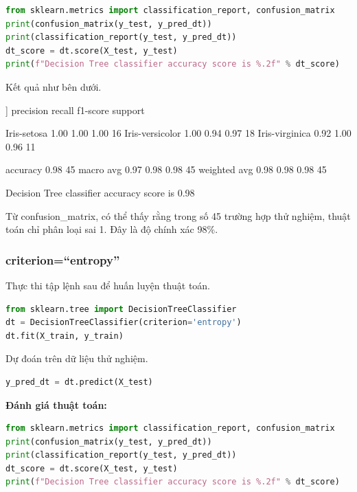 \begin{lstlisting}[language=Python]
from sklearn.metrics import classification_report, confusion_matrix
print(confusion_matrix(y_test, y_pred_dt))
print(classification_report(y_test, y_pred_dt))
dt_score = dt.score(X_test, y_test)
print(f"Decision Tree classifier accuracy score is %.2f" % dt_score)
\end{lstlisting}

Kết quả như bên dưới.

\begin{terminaloutput}
[[16  0  0]
[ 0 17  1]
[ 0  0 11]]
                 precision    recall  f1-score   support

    Iris-setosa       1.00      1.00      1.00        16
Iris-versicolor       1.00      0.94      0.97        18
 Iris-virginica       0.92      1.00      0.96        11

       accuracy                           0.98        45
      macro avg       0.97      0.98      0.98        45
   weighted avg       0.98      0.98      0.98        45

Decision Tree classifier accuracy score is 0.98
\end{terminaloutput}

Từ confusion\_matrix, có thể thấy rằng trong số 45 trường hợp
thử nghiệm, thuật toán chỉ phân loại sai 1. Đây là độ chính xác 98\%.

\subsubsection{criterion=\enquote{entropy}}
Thực thi tập lệnh sau để huấn luyện thuật toán.

\begin{lstlisting}[language=Python]
from sklearn.tree import DecisionTreeClassifier
dt = DecisionTreeClassifier(criterion='entropy')
dt.fit(X_train, y_train)
\end{lstlisting}

Dự đoán trên dữ liệu thử nghiệm.

\begin{lstlisting}[language=Python]
y_pred_dt = dt.predict(X_test)
\end{lstlisting}

\textbf{Đánh giá thuật toán:}

\begin{lstlisting}[language=Python]
from sklearn.metrics import classification_report, confusion_matrix
print(confusion_matrix(y_test, y_pred_dt))
print(classification_report(y_test, y_pred_dt))
dt_score = dt.score(X_test, y_test)
print(f"Decision Tree classifier accuracy score is %.2f" % dt_score)
\end{lstlisting}

